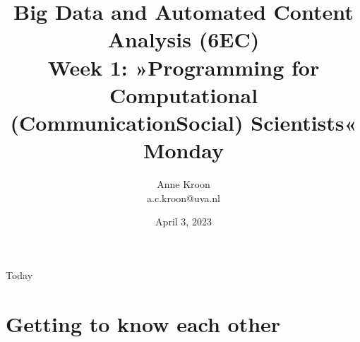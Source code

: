 

\graphicspath{{../../resources/img/}}



\title[Big Data and Automated Content Analysis]{\textbf{Big Data and Automated Content Analysis (6EC)} 
\\Week 1: »Programming for Computational (Communication\textbar Social) Scientists«
\\Monday }
\author[Anne Kroon]{Anne Kroon\\ \footnotesize{a.c.kroon@uva.nl}}
\date{April 3, 2023}


\begin{frame}{}
	\titlepage
\end{frame}

\begin{frame}{Today}
	\tableofcontents
\end{frame}

\section{Getting to know each other}

